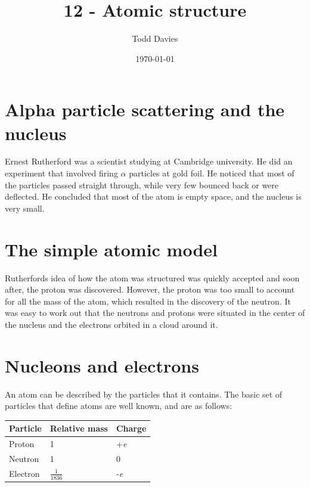 \documentclass{article}
\title{12 - Atomic structure}
\author{Todd Davies}
\date{\today}
\begin{document}
\lhead{\today}

\maketitle

\section*{Alpha particle scattering and the nucleus}
\thispagestyle{empty}

Ernest Rutherford was a scientist studying at Cambridge university. He did an
experiment that involved firing $\alpha$ particles at gold foil. He noticed that
most of the particles passed straight through, while very few bounced back or
were deflected. He concluded that most of the atom is empty space, and the
nucleus is very small.

\section*{The simple atomic model}

Rutherfords idea of how the atom was structured was quickly accepted and soon
after, the proton was discovered. However, the proton was too small to account
for all the mass of the atom, which resulted in the discovery of the neutron. It
was easy to work out that the neutrons and protons were situated in the center
of the nucleus and the electrons orbited in a cloud around it.

\section*{Nucleons and electrons}

An atom can be described by the particles that it contains. The basic set of
particles that define atoms are well known, and are as follows:

\begin{center}
 	\renewcommand{\arraystretch}{1.2}
	\begin{tabular}{l|l|l}
		{\bf Particle} & {\bf Relative mass} & {\bf Charge} \\ \hline
		Proton & 1 & +{\it e}\\ \hline
		Neutron & 1 & 0\\ \hline
		Electron & $\frac{1}{1836}$ & -{\it e}
	\end{tabular}

\end{center}
\end{document}
